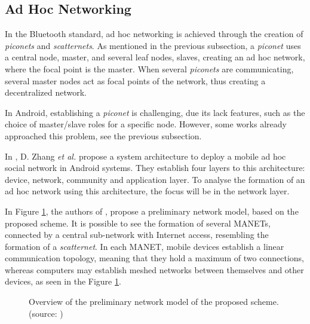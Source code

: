 \subsection{Ad Hoc Networking}

In the Bluetooth standard, ad hoc networking is achieved through the creation of \textit{piconets} and \textit{scatternets}. As mentioned in the previous subsection, a \textit{piconet} uses a central node, master, and several leaf nodes, slaves, creating an ad hoc network, where the focal point is the master. When several \textit{piconets} are communicating, several master nodes act as focal points of the network, thus creating a decentralized network.

In Android, establishing a \textit{piconet} is challenging, due its lack features, such as the choice of master/slave roles for a specific node. However, some works already approached this problem, see the previous subsection.

In \cite{basa}, D. Zhang \textit{et al.} propose a system architecture to deploy a mobile ad hoc social network in Android systems. They establish four layers to this architecture: device, network, community and application layer. To analyse the formation of an ad hoc network using this architecture, the focus will be in the network layer.

In Figure \ref{fig:basanet}, the authors of \cite{basa}, propose a preliminary network model, based on the proposed scheme. It is possible to see the formation of several \glspl{MANET}, connected by a central sub-network with Internet access, resembling the formation of a \textit{scatternet}. In each \gls{MANET}, mobile devices establish a linear communication topology, meaning that they hold a maximum of two connections, whereas computers may establish meshed networks between themselves and other devices, as seen in the Figure \ref{fig:basanet}.

\begin{figure}[ht]
	\noindent{}
	\caption{\label{fig:basanet} Overview of the preliminary network model of the proposed scheme. (source: \cite{basa})}
\end{figure}

